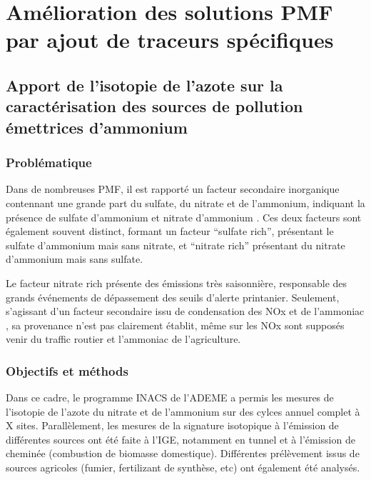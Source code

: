 \section{Amélioration des solutions PMF par ajout de traceurs spécifiques}%
\label{sec:amélioration_des_solutions_pmf}

\subsection{Apport de l'isotopie de l’azote sur la caractérisation des sources de pollution émettrices d’ammonium}%
\label{sub:isotopie}

\subsubsection{Problématique}%
\label{ssub:problématique}

Dans de nombreuses PMF, il est rapporté un facteur secondaire inorganique contennant une
grande part du sulfate, du nitrate et de l'ammonium, indiquant la présence de sulfate
d'ammonium  et nitrate d'ammonium . Ces deux facteurs sont
également souvent distinct, formant un facteur ``sulfate rich'', présentant le sulfate
d'ammonium mais sans nitrate, et ``nitrate rich'' présentant du nitrate d'ammonium mais
sans sulfate.

Le facteur nitrate rich présente des émissions très saisonnière, responsable des grands
événements de dépassement des seuils d'alerte printanier. Seulement, s'agissant d'un
facteur secondaire issu de condensation des NOx et de l'ammoniac , sa provenance
n'est pas clairement établit, même sur les NOx sont supposés venir du traffic routier et
l'ammoniac de l'agriculture.

\subsubsection{Objectifs et méthods}%
\label{ssub:objectif}

Dans ce cadre, le programme INACS de l'ADEME a permis les mesures de
l'isotopie de l'azote du nitrate et de l'ammonium sur des cylces annuel complet à X sites.
Parallèlement, les mesures de la signature isotopique à l'émission de différentes sources
ont été faite à l'IGE, notamment en tunnel et à l'émission de cheminée (combustion de
biomasse domestique). Différentes prélèvement issus de sources agricoles (fumier, fertilizant
de synthèse, etc) ont également été analysés.

